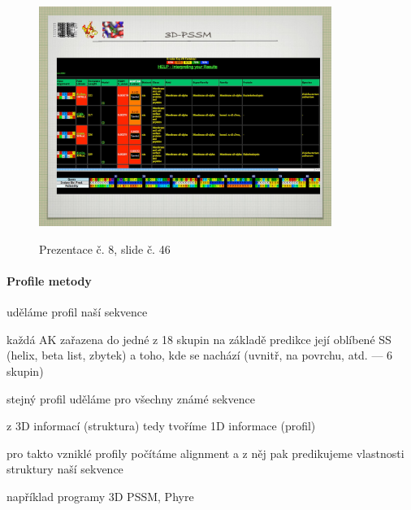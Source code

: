 \documentclass[DIV=8]{scrreprt}
\begin{document}
\begin{figure}
    \caption{Prezentace č. 8, slide č. 46}
    \includegraphics[width=0.85\textwidth]{slides-8/slide-46.jpg}
    \centering
    \label{slides-8-slide-46}
\end{figure}

\paragraph{Profile metody}
\begin{myEnumerate}[nosep]
    \item uděláme profil naší sekvence
\begin{myItemize}[nosep]
    \item každá AK zařazena do jedné z 18 skupin na základě predikce její oblíbené SS (helix, beta list, zbytek) a toho, kde se nachází (uvnitř, na povrchu, atd. --- 6 skupin)
\end{myItemize}

    \item stejný profil uděláme pro všechny známé sekvence
\begin{myItemize}[nosep]
    \item z 3D informací (struktura) tedy tvoříme 1D informace (profil)
\end{myItemize}

    \item pro takto vzniklé profily počítáme alignment a z něj pak predikujeme vlastnosti struktury naší sekvence
\begin{myItemize}[nosep]
    \item například programy 3D PSSM, Phyre
\end{myItemize}

\end{myEnumerate}
\end{document}
